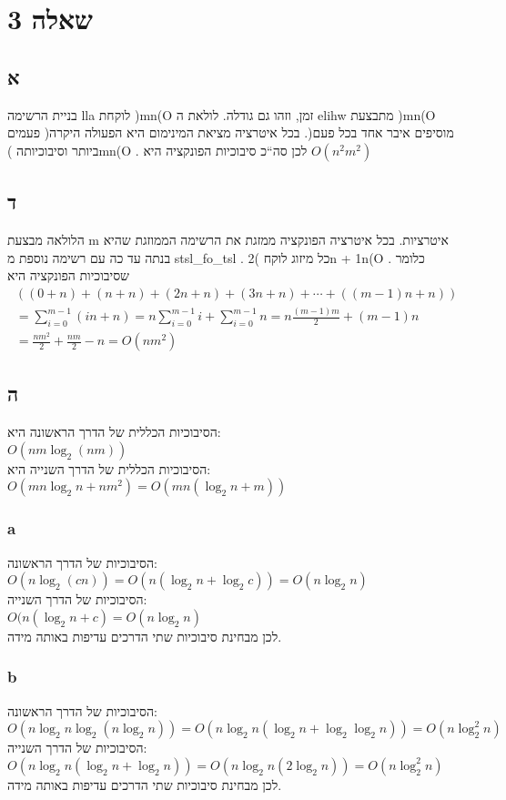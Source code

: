 \documentclass[a4paper]{article}
\begin{document}
\section*{שאלה 3}
\subsection*{א}
בניית הרשימה 
lla
לוקחת
)mn(O
זמן, וזהו גם גודלה.
לולאת ה
elihw
מתבצעת 
)mn(O
פעמים )מוסיפים איבר אחד בכל פעם(. בכל איטרציה  מציאת המינימום היא הפעולה היקרה ביותר וסיבוכיותה
)mn(O
. לכן סה``כ סיבוכיות הפונקציה היא
$O(n^{2}m^{2})$
\subsection*{ד}
הלולאה מבצעת 
m
איטרציות. בכל איטרציה הפונקציה ממזגת את הרשימה הממוזגת שהיא בנתה עד כה עם רשימה נוספת מ
stsl\_fo\_tsl
. כל מיזוג לוקח
)2n + 1n(O
. כלומר שסיבוכיות הפונקציה היא
\begin{equation*}
    \begin{split}
        ( (0+n) + (n+n) + (2n+n) + (3n + n) + \cdots + ( (m-1)n + n)) \\
        = \sum\limits_{i=0}^{m-1} (in+n)
        = n\sum\limits_{i=0}^{m-1} i + \sum\limits_{i=0}^{m-1} n
        = n \frac{(m-1)m}{2} + (m-1)n \\
        = \frac{nm^2}{2} + \frac{nm}{2} - n
        = O(nm^2)
    \end{split}
\end{equation*}
\subsection*{ה}
הסיבוכיות הכללית של הדרך הראשונה היא: \\
$O(nm \log_2 (nm))$ \\
הסיבוכיות הכללית של הדרך השנייה היא: \\
$O(mn \log_2 n + nm^2) = O(mn(\log_2 n + m))$
\subsubsection*{a}
הסיבוכיות של הדרך הראשונה: \\
$O(n \log_2 (cn)) = O(n (\log_2 n + \log_2 c)) = O(n \log_2 n)$ \\
הסיבוכיות של הדרך השנייה: \\
$O(n (\log_2 n + c) = O(n \log_2 n)$ \\
לכן מבחינת סיבוכיות שתי הדרכים עדיפות באותה מידה.
\subsubsection*{b}
הסיבוכיות של הדרך הראשונה: \\
$O(n \log_2 n \log_2(n \log_2 n)) = O(n \log_2 n (\log_2 n + \log_2 \log_2 n)) = O(n \log_2^2 n)$ \\
הסיבוכיות של הדרך השנייה: \\
$O(n \log_2 n (\log_2 n + \log_2 n)) = O(n \log_2 n (2\log_2 n)) = O(n \log_2^2 n)$ \\
לכן מבחינת סיבוכיות שתי הדרכים עדיפות באותה מידה. 
\end{document}
